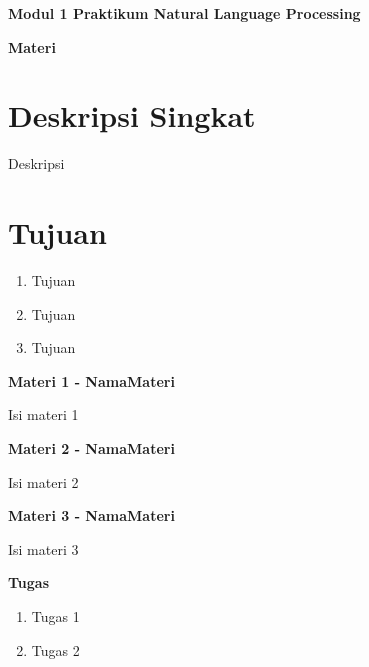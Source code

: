 \documentclass{article}
\begin{document}
    \begin{center}
        \textbf{Modul 1 Praktikum Natural Language Processing}

        \textbf{Materi}
    \end{center}

    \section*{Deskripsi Singkat}
    Deskripsi

    \section*{Tujuan}
    \begin{enumerate}
        \item Tujuan
        \item Tujuan
        \item Tujuan
    \end{enumerate}

    \begin{flushleft}
        \textbf{Materi 1 \@- NamaMateri}
        \newline

        Isi materi 1
    \end{flushleft}

    \begin{flushleft}
        \textbf{Materi 2 \@- NamaMateri}
        \newline

        Isi materi 2
    \end{flushleft}

    \begin{flushleft}
        \textbf{Materi 3 \@- NamaMateri}
        \newline

        Isi materi 3
    \end{flushleft}

    \newpage
    \begin{flushleft}
        \textbf{Tugas}
        \newline

        \begin{enumerate}
            \item Tugas 1
            \item Tugas 2
        \end{enumerate}
    \end{flushleft}
\end{document}
